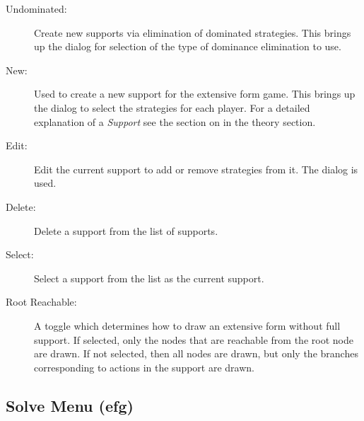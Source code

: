 \documentclass[12pt]{report}
\begin{document}
\begin{description}
\item[Undominated:] Create new supports via elimination of dominated
strategies.  This brings up the  dialog for selection of the type of
dominance elimination to use.
\item[New:] Used to create a new support for the extensive form game.
This brings up the  dialog to select
the strategies for each player.  For a detailed explanation of a {\em
Support} see the section on  in the
theory section.
\item[Edit:] Edit the current support to add or remove strategies from
it. The  dialog is used.  
\item[Delete:] Delete a support from the list of supports.   
\item[Select:] Select a support from the list as the current support.  
\item[Root Reachable:] A toggle which determines how to draw an
extensive form without full support. If selected, only the nodes that
are reachable from the root node are drawn.  If not selected, then all
nodes are drawn, but only the branches corresponding to actions in the
support are drawn.
\end{description}

\subsection{Solve Menu (efg)}\label{efsolve}
\end{document}
